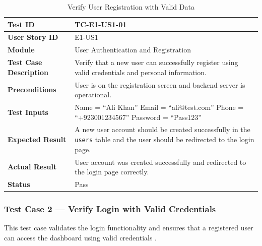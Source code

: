 \begin{longtable}{|p{4cm}|p{8cm}|}
\caption{Verify User Registration with Valid Data}
\label{tab:tc_registration} \\
\hline
\textbf{Test ID} & TC-E1-US1-01 \\ \hline
\textbf{User Story ID} & E1-US1 \\ \hline
\textbf{Module} & User Authentication and Registration \\ \hline
\textbf{Test Case Description} & Verify that a new user can 
successfully register using valid credentials and personal 
information. \\ \hline
\textbf{Preconditions} & User is on the registration screen and 
backend server is operational. \\ \hline
\textbf{Test Inputs} &
Name = ``Ali Khan'' \newline
Email = ``ali@test.com'' \newline
Phone = ``+923001234567'' \newline
Password = ``Pass123'' \\ \hline
\textbf{Expected Result} & A new user account should be created 
successfully in the \texttt{users} table and the user should be 
redirected to the login page. \\ \hline
\textbf{Actual Result} & User account was created successfully and 
redirected to the login page correctly. \\ \hline
\textbf{Status} & Pass \\ \hline
\end{longtable}

\subsubsection{Test Case 2 --- Verify Login with Valid Credentials}

This test case validates the login functionality and ensures that a 
registered user can access the dashboard using valid credentials 
\cite{jwtauth2017}.

